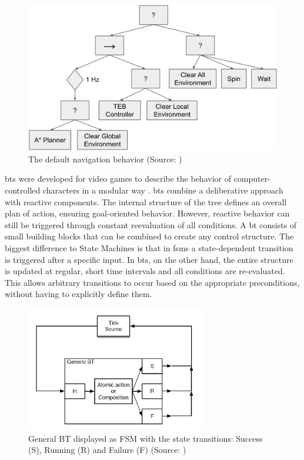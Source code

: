 \begin{figure}[h]
    \centering \captionsetup{justification=centering}
    \includegraphics[width=\textwidth]{figures/20_state_of_the_art/nav2_bt.png}
    \caption[The default navigation behavior]{The default navigation behavior (Source: \cite{macenski_marathon_2020})}
    \label{fig:nav2_bt}
\end{figure}

\Glspl{bt} were developed for video games to describe the behavior of computer-controlled characters in a modular way \cite{hutchison_evolving_2010}. \Glspl{bt} combine a deliberative approach with reactive components. The internal structure of the tree defines an overall plan of action, ensuring goal-oriented behavior. However, reactive behavior can still be triggered through constant reevaluation of all conditions. A \gls{bt} consists of small building blocks that can be combined to create any control structure. The biggest difference to State Machines is that in \glspl{fsm} a state-dependent transition is triggered after a specific input. In \glspl{bt}, on the other hand, the entire structure is updated at regular, short time intervals and all conditions are re-evaluated. This allows arbitrary transitions to occur based on the appropriate preconditions, without having to explicitly define them.

\begin{figure}[h]
    \centering
    \includegraphics[width=0.7\textwidth]{figures/20_state_of_the_art/fsm_general_bt.png}
    \caption[General BT displayed as FSM]{General BT displayed as FSM with the state transitions: Success (S), Running (R) and Failure (F) (Source: \cite{colledanchise_behavior_2018})}
    \label{fig:fsm_general_bt}
\end{figure}


